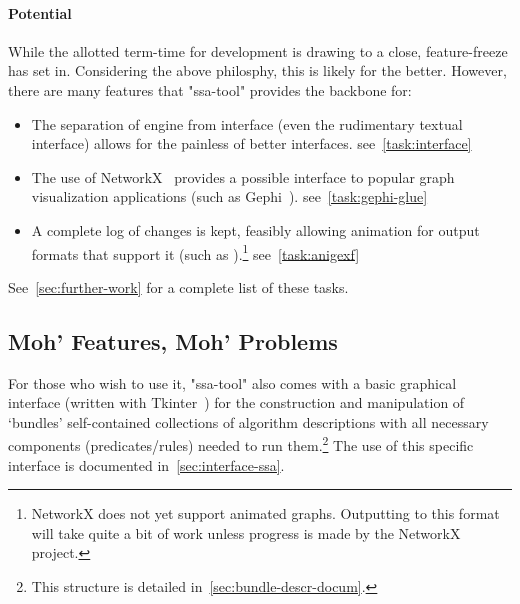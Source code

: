 \paragraph{Potential}
While the allotted term-time for development is drawing to a close,
  feature-freeze has set in.
Considering the above philosphy, this is likely for the better.
However, there are many features that "ssa-tool" provides the backbone for:
\begin{itemize}
\providecommand\TaskRef[1]{\hfill\mbox{see~\autoref{task:#1}}}
\item The separation of engine from interface (even the rudimentary textual interface)
  allows for the painless of better interfaces.
  \TaskRef{interface}
\item The use of NetworkX~\autocite{hagberg:networkx} provides a possible
  interface to popular graph visualization applications (such as Gephi~\autocite{gephi}).
  \TaskRef{gephi-glue}
\item A complete log of changes is kept, feasibly allowing animation for
  output formats that support it (such as ).\footnote{%
    NetworkX does not yet support animated graphs.
    Outputting to this format will take quite a bit of work
      unless progress is made by the NetworkX project.}
  \TaskRef{anigexf}
\end{itemize}
See~\autoref{sec:further-work} for a complete list of these tasks.

\subsection{Moh' Features, Moh' Problems}
For those who wish to use it,
  "ssa-tool" also comes with a basic graphical interface (written with Tkinter~\autocite{tkinter})
  for the construction and manipulation of \enquote*{bundles} \Dash
  self-contained collections of algorithm descriptions
  with all necessary components (predicates\slash rules)
  needed to run them.\footnote{This structure is detailed in~\autoref{sec:bundle-descr-docum}.}
The use of this specific interface is documented in~\autoref{sec:interface-ssa}.

